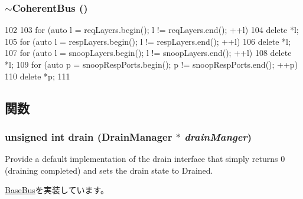 \hypertarget{classCoherentBus_a9f68bdf0f3ed90b32cf54e32f4bfc0b2}{
\subsubsection[{$\sim$CoherentBus}]{\setlength{\rightskip}{0pt plus 5cm}$\sim${\bf CoherentBus} ()}}
\label{classCoherentBus_a9f68bdf0f3ed90b32cf54e32f4bfc0b2}



\begin{DoxyCode}
102 {
103     for (auto l = reqLayers.begin(); l != reqLayers.end(); ++l)
104         delete *l;
105     for (auto l = respLayers.begin(); l != respLayers.end(); ++l)
106         delete *l;
107     for (auto l = snoopLayers.begin(); l != snoopLayers.end(); ++l)
108         delete *l;
109     for (auto p = snoopRespPorts.begin(); p != snoopRespPorts.end(); ++p)
110         delete *p;
111 }
\end{DoxyCode}


\subsection{関数}
\hypertarget{classCoherentBus_aa8a18d230dba7a674ac8a0b4f35bc36a}{
\subsubsection[{drain}]{\setlength{\rightskip}{0pt plus 5cm}unsigned int drain ({\bf DrainManager} $\ast$ {\em drainManger})}}
\label{classCoherentBus_aa8a18d230dba7a674ac8a0b4f35bc36a}
Provide a default implementation of the drain interface that simply returns 0 (draining completed) and sets the drain state to Drained. 

\hyperlink{classBaseBus_ac8c1510f7e1591e75a5c79b4b873f6b4}{BaseBus}を実装しています。


